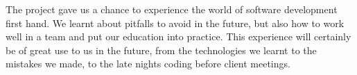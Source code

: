 \documentclass{l3proj}
\begin{document}
The project gave us a chance to experience the world of software development
 first hand. We learnt about pitfalls to avoid in the future, but also how
 to work well in a team and put our education into practice. This experience
 will certainly be of great use to us in the future, from the technologies we
 learnt to the mistakes we made, to the late nights coding before client meetings.

\newpage

\end{document}

